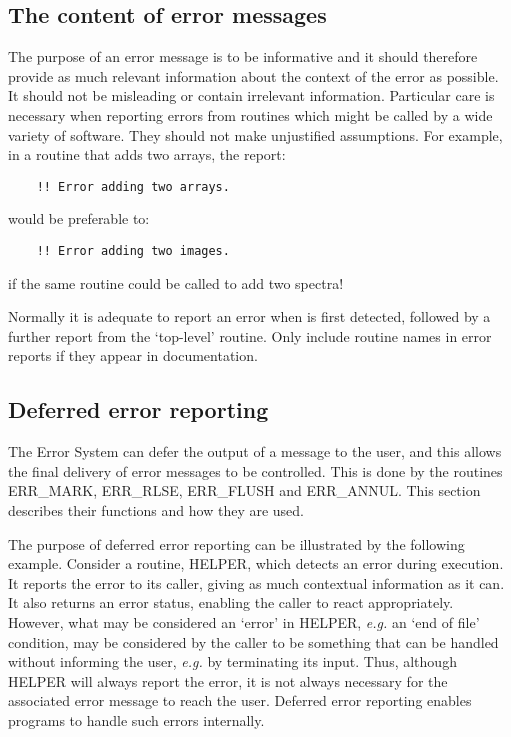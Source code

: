\subsection{The content of error messages}

The purpose of an error message is to be informative and it should therefore
provide as much relevant information about the context of the error as possible.
It should not be misleading or contain irrelevant information.
Particular care is necessary when reporting errors from routines which might
be called by a wide variety of software.
They should not make unjustified assumptions.
For example, in a routine that adds two arrays, the report:

\begin{small}
\begin{verbatim}
    !! Error adding two arrays.
\end{verbatim}
\end{small}

would be preferable to:

\begin{small}
\begin{verbatim}
    !! Error adding two images.
\end{verbatim}
\end{small}

if the same routine could be called to add two spectra!

Normally it is adequate to report an error when is first detected, followed by
a further report from the `top-level' routine.
Only include routine names in error reports if they appear in documentation.

\subsection {Deferred error reporting}

The Error System can defer the output of a message to the user, and this allows
the final delivery of error messages to be controlled.
This is done by the routines ERR\_MARK, ERR\_RLSE, ERR\_FLUSH and ERR\_ANNUL. 
This section describes their functions and how they are used.

The purpose of deferred error reporting can be illustrated by the following
example.
Consider a routine, HELPER, which detects an error during execution. 
It reports the error to its caller, giving as much contextual information as
it can.
It also returns an error status, enabling the caller to react appropriately. 
However, what may be considered an `error' in HELPER, {\em e.g.} an `end of
file' condition, may be considered by the caller to be something that can be
handled without informing the user, {\em e.g.} by terminating its input.
Thus, although HELPER will always report the error, it is not always necessary
for the associated error message to reach the user. 
Deferred error reporting enables programs to handle such errors internally.


